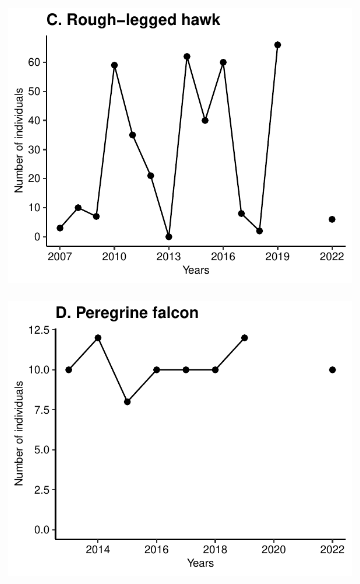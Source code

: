 \documentclass[a4paper,twoside,12pt]{article}
\begin{document}
\begin{figure}[h]
\begin{subfigure}{0.45\textwidth}
  \end{subfigure} 
    \hfill
    \hfill
  \begin{subfigure}{0.45\textwidth}
    \includegraphics[width=\linewidth]{figures/species_temporal_series/Rough-legged_hawk.pdf}
  \end{subfigure}
  \begin{subfigure}{0.45\textwidth}
    \includegraphics[width=\linewidth]{figures/species_temporal_series/Peregrine_falcon.pdf}
  \end{subfigure}
\end{figure}
\newpage
\end{document}
